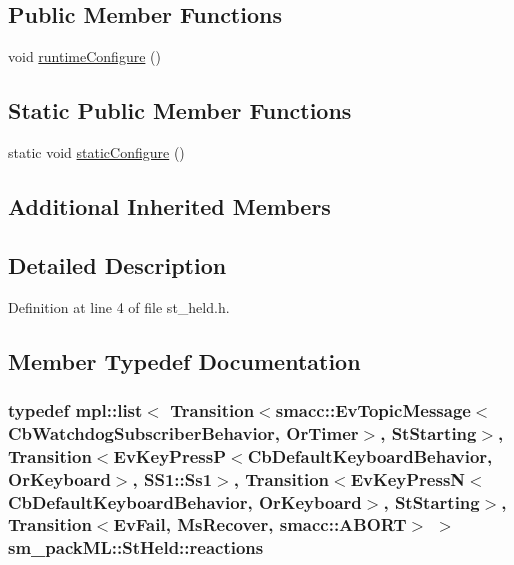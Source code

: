 \subsection*{Public Member Functions}
\begin{DoxyCompactItemize}
\item 
void \hyperlink{structsm__packML_1_1StHeld_a58e225d37891ed694b2bf6da41bc802c}{runtime\+Configure} ()
\end{DoxyCompactItemize}
\subsection*{Static Public Member Functions}
\begin{DoxyCompactItemize}
\item 
static void \hyperlink{structsm__packML_1_1StHeld_a18fcebb225f7c4893932b8b9c3de4276}{static\+Configure} ()
\end{DoxyCompactItemize}
\subsection*{Additional Inherited Members}


\subsection{Detailed Description}


Definition at line 4 of file st\+\_\+held.\+h.



\subsection{Member Typedef Documentation}
\subsubsection[{\texorpdfstring{reactions}{reactions}}]{\setlength{\rightskip}{0pt plus 5cm}typedef mpl\+::list$<$ Transition$<${\bf smacc\+::\+Ev\+Topic\+Message}$<${\bf Cb\+Watchdog\+Subscriber\+Behavior}, {\bf Or\+Timer}$>$, {\bf St\+Starting}$>$, Transition$<$Ev\+Key\+PressP$<$Cb\+Default\+Keyboard\+Behavior, {\bf Or\+Keyboard}$>$, {\bf S\+S1\+::\+Ss1}$>$, Transition$<$Ev\+Key\+PressN$<$Cb\+Default\+Keyboard\+Behavior, {\bf Or\+Keyboard}$>$, {\bf St\+Starting}$>$, Transition$<${\bf Ev\+Fail}, {\bf Ms\+Recover}, {\bf smacc\+::\+A\+B\+O\+RT}$>$ $>$ {\bf sm\+\_\+pack\+M\+L\+::\+St\+Held\+::reactions}}\hypertarget{structsm__packML_1_1StHeld_ae1ea508a2506f48a1c50f895ade16aad}{}\label{structsm__packML_1_1StHeld_ae1ea508a2506f48a1c50f895ade16aad}


